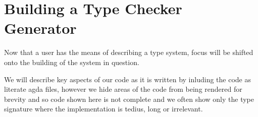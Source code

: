 \chapter{Building a Type Checker Generator}

Now that a user has the means of describing a type system, focus will
be shifted onto the building of the system in question.

We will describe key aspects of our code as it is written by inluding
the code as literate agda files, however we hide areas of the code
from being rendered for brevity and so code shown here is not
complete and we often show only the type signature where the
implementation is tedius, long or irrelevant.
\\\\















